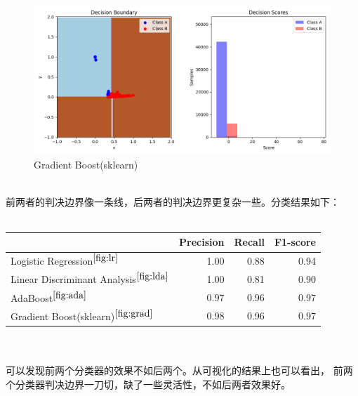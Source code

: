 \documentclass[12pt]{article}
\begin{document}
\begin{figure}[htbp]
\centering
\includegraphics[width=1.0\textwidth]{../gradboost.png}
\caption{Gradient Boost(sklearn)}
\label{fig:grad}
\end{figure}
\\
前两者的判决边界像一条线，后两者的判决边界更复杂一些。分类结果如下：\\
\\
\begin{tabular}{l|r|r|r}
  \hline
  &Precision&Recall&F1-score\\
  \hline
  Logistic Regression$^{\ref{fig:lr}}$& 1.00&0.88&0.94\\
  \hline
  Linear Discriminant Analysis$^{\ref{fig:lda}}$&1.00&0.81&0.90\\
  \hline
  AdaBoost$^{\ref{fig:ada}}$&0.97&0.96&0.97\\
  \hline
  Gradient Boost(sklearn)$^{\ref{fig:grad}}$&0.98&0.96&0.97\\
  \hline
\end{tabular}
\\
\\
可以发现前两个分类器的效果不如后两个。从可视化的结果上也可以看出，
前两个分类器判决边界一刀切，缺了一些灵活性，不如后两者效果好。
\newpage
\end{document}
